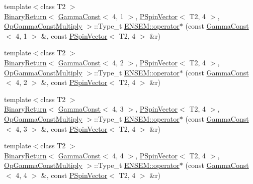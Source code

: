 \begin{DoxyCompactItemize}
{\footnotesize template$<$class T2 $>$ }\\\mbox{\hyperlink{structENSEM_1_1BinaryReturn}{Binary\+Return}}$<$ \mbox{\hyperlink{classENSEM_1_1GammaConst}{Gamma\+Const}}$<$ 4, 1 $>$, \mbox{\hyperlink{classENSEM_1_1PSpinVector}{P\+Spin\+Vector}}$<$ T2, 4 $>$, \mbox{\hyperlink{structENSEM_1_1OpGammaConstMultiply}{Op\+Gamma\+Const\+Multiply}} $>$\+::Type\+\_\+t \mbox{\hyperlink{group__primspinvector_ga78fc0ed12245c6b5e7ab51e07bd4c553}{E\+N\+S\+E\+M\+::operator$\ast$}} (const \mbox{\hyperlink{classENSEM_1_1GammaConst}{Gamma\+Const}}$<$ 4, 1 $>$ \&, const \mbox{\hyperlink{classENSEM_1_1PSpinVector}{P\+Spin\+Vector}}$<$ T2, 4 $>$ \&r)
\item 
{\footnotesize template$<$class T2 $>$ }\\\mbox{\hyperlink{structENSEM_1_1BinaryReturn}{Binary\+Return}}$<$ \mbox{\hyperlink{classENSEM_1_1GammaConst}{Gamma\+Const}}$<$ 4, 2 $>$, \mbox{\hyperlink{classENSEM_1_1PSpinVector}{P\+Spin\+Vector}}$<$ T2, 4 $>$, \mbox{\hyperlink{structENSEM_1_1OpGammaConstMultiply}{Op\+Gamma\+Const\+Multiply}} $>$\+::Type\+\_\+t \mbox{\hyperlink{group__primspinvector_ga89998f51b7e59a05842c92f95ca427e4}{E\+N\+S\+E\+M\+::operator$\ast$}} (const \mbox{\hyperlink{classENSEM_1_1GammaConst}{Gamma\+Const}}$<$ 4, 2 $>$ \&, const \mbox{\hyperlink{classENSEM_1_1PSpinVector}{P\+Spin\+Vector}}$<$ T2, 4 $>$ \&r)
\item 
{\footnotesize template$<$class T2 $>$ }\\\mbox{\hyperlink{structENSEM_1_1BinaryReturn}{Binary\+Return}}$<$ \mbox{\hyperlink{classENSEM_1_1GammaConst}{Gamma\+Const}}$<$ 4, 3 $>$, \mbox{\hyperlink{classENSEM_1_1PSpinVector}{P\+Spin\+Vector}}$<$ T2, 4 $>$, \mbox{\hyperlink{structENSEM_1_1OpGammaConstMultiply}{Op\+Gamma\+Const\+Multiply}} $>$\+::Type\+\_\+t \mbox{\hyperlink{group__primspinvector_gade157607bce53ec9ffcde3e07f772efb}{E\+N\+S\+E\+M\+::operator$\ast$}} (const \mbox{\hyperlink{classENSEM_1_1GammaConst}{Gamma\+Const}}$<$ 4, 3 $>$ \&, const \mbox{\hyperlink{classENSEM_1_1PSpinVector}{P\+Spin\+Vector}}$<$ T2, 4 $>$ \&r)
\item 
{\footnotesize template$<$class T2 $>$ }\\\mbox{\hyperlink{structENSEM_1_1BinaryReturn}{Binary\+Return}}$<$ \mbox{\hyperlink{classENSEM_1_1GammaConst}{Gamma\+Const}}$<$ 4, 4 $>$, \mbox{\hyperlink{classENSEM_1_1PSpinVector}{P\+Spin\+Vector}}$<$ T2, 4 $>$, \mbox{\hyperlink{structENSEM_1_1OpGammaConstMultiply}{Op\+Gamma\+Const\+Multiply}} $>$\+::Type\+\_\+t \mbox{\hyperlink{group__primspinvector_gaa8429bcfc1a7a130ec526f34f8b08c20}{E\+N\+S\+E\+M\+::operator$\ast$}} (const \mbox{\hyperlink{classENSEM_1_1GammaConst}{Gamma\+Const}}$<$ 4, 4 $>$ \&, const \mbox{\hyperlink{classENSEM_1_1PSpinVector}{P\+Spin\+Vector}}$<$ T2, 4 $>$ \&r)

\end{DoxyCompactItemize}
